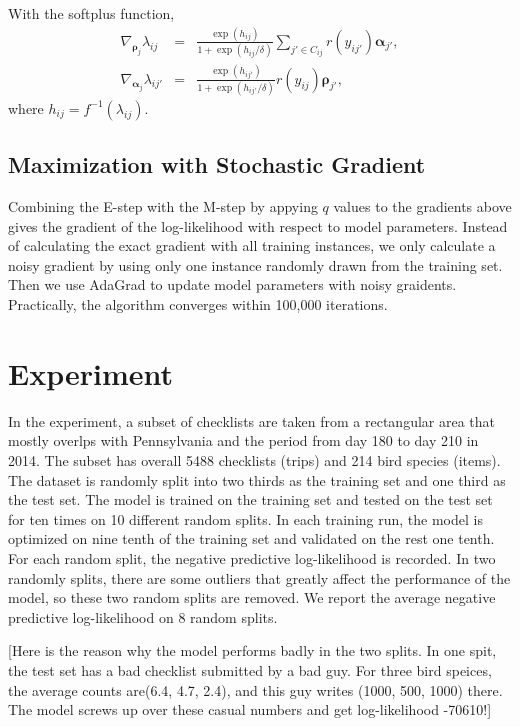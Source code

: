 \documentclass{article}
\newcommand{\wt}{\boldsymbol{\rho}}
\newcommand{\emb}{\boldsymbol{\alpha}}
\begin{document}
With the softplus function, 
\begin{eqnarray}
\nabla_{\wt_j} \lambda_{ij} &=& \frac{\exp(h_{ij})}{1 + \exp(h_{ij} / \delta)} \sum_{j' \in C_{ij}} r(y_{ij'}) \emb_{j'}, \\
\nabla_{\emb_{j}} \lambda_{ij'} &=& \frac{\exp(h_{ij'})}{1 + \exp(h_{ij'} / \delta)}  r(y_{ij}) \wt_{j'},
\end{eqnarray}
where $h_{ij} = f^{-1}(\lambda_{ij})$.



\subsection{Maximization with Stochastic Gradient}

Combining the E-step with the M-step by appying $q$ values to the gradients above gives the gradient of the log-likelihood with respect to model parameters. 
Instead of calculating the exact gradient with all training instances, we only calculate a noisy gradient by using only one instance randomly drawn from the 
training set. Then we use AdaGrad to update model parameters with noisy graidents. Practically, the algorithm converges within 100,000 iterations. 

\section{Experiment}

In the experiment, a subset of checklists are taken from a rectangular area that mostly overlps with Pennsylvania and the period from day 180 to day 210 in 2014. The 
subset has  overall 5488 checklists (trips)
and 214 bird species (items). The dataset is randomly split into two thirds as the training set and one third as the test set. The model is trained on the training set and tested on the test set for ten times on 10 different random splits. In each training run, the model is optimized on nine tenth of the training set and validated on the rest one tenth. For each random split, the negative predictive log-likelihood is recorded. In two randomly splits, there are some outliers that greatly affect the performance of the model, so these two random splits are removed. We report the average negative predictive log-likelihood on 8 random splits.

[Here is the reason why the model performs badly in the two splits. In one spit, the test set has a bad checklist submitted by a bad guy. For three bird speices, the average counts are(6.4, 4.7, 2.4), and this guy writes (1000, 500, 1000) there. The model screws up over these casual numbers and get log-likelihood -70610!]
\end{document}
